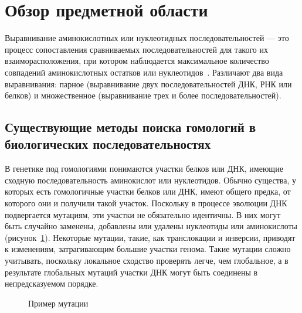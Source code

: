 \newpage

\section[Обзор предметной области]{\large \centering Обзор предметной области}
\hspace{\parindent} Выравнивание аминокислотных или нуклеотидных последовательностей --- это процесс сопоставления сравниваемых последовательностей для такого их взаиморасположения, при котором наблюдается максимальное количество совпадений аминокислотных остатков или нуклеотидов~\cite{AlignmentClustal}. Различают два вида выравнивания: парное (выравнивание двух последовательностей ДНК, РНК или белков) и множественное (выравнивание трех и более последовательностей). 

\subsection[Существующие методы поиска гомологий в биологических последовательностях]{\large Существующие методы поиска гомологий в биологических последовательностях} \label{sec:SearchHmlg}
\hspace{\parindent} В генетике под гомологиями понимаются участки белков или ДНК, имеющие сходную последовательность аминокислот или нуклеотидов. Обычно существа, у которых есть гомологичные участки белков или ДНК, имеют общего предка, от которого они и получили такой участок. Поскольку в процессе эволюции ДНК подвергается мутациям, эти участки не обязательно идентичны. В них могут быть случайно заменены, добавлены или удалены нуклеотиды или аминокислоты (рисунок~\ref{ris:Mutation}). Некоторые мутации, такие, как транслокации и инверсии, приводят к изменениям, затрагивающим большие участки генома. Такие мутации сложно учитывать, поскольку локальное сходство проверять легче, чем глобальное, а в результате глобальных мутаций участки ДНК могут быть соединены в непредсказуемом порядке. %

\begin{figure}[h]
	\caption{Пример мутации}
	\label{ris:Mutation}
\end{figure}

